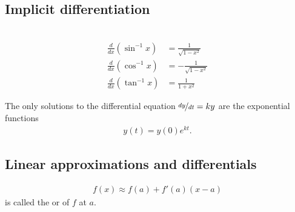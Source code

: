 \documentclass{article}
\begin{document}
\subsection{Implicit differentiation}
\begin{theorem}
    \\
    \begin{align*}
        \frac{d}{dx}(\sin^{-1}x)&=\frac{1}{\sqrt{1-x^2}}\\
        \frac{d}{dx}(\cos^{-1}x)&=-\frac{1}{\sqrt{1-x^2}}\\
        \frac{d}{dx}(\tan^{-1}x)&=\frac{1}{1+x^2}
    \end{align*}
\end{theorem}
\begin{theorem}
    The only solutions to the differential equation $\nicefrac{dy}{dt}=ky$ are the exponential functions
    \begin{align*}
        y(t)=y(0)e^{kt}.
    \end{align*}
\end{theorem}
\setcounter{subsection}{9}
\subsection{Linear approximations and differentials}
\begin{theorem}
    \begin{align*}
        f(x)\approx f(a)+f'(a)(x-a)
    \end{align*}
    is called the  or  of $f$ at $a$.
\end{theorem}
\end{document}
